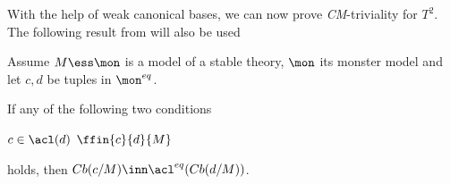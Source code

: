 \medskip
With the help of weak canonical bases, we can now prove {\sl CM}-triviality for $T^{2}$.
The following result from \cite{pilcm} will also be used
\begin{fact}\label{pilcb}
Assume $M\ess\mon$ is a model of a stable theory, $\mon$ its monster model and let $c,d$ be tuples in $\mon^{eq}$.

If any of the following two conditions
\begin{itemize}
$c\in\acl(d)$ %
$\ffin{c}{d}{M}$ %
\end{itemize}
holds, then $Cb(c/M)\inn\acl^{eq}(Cb(d/M))$.
\end{fact}

